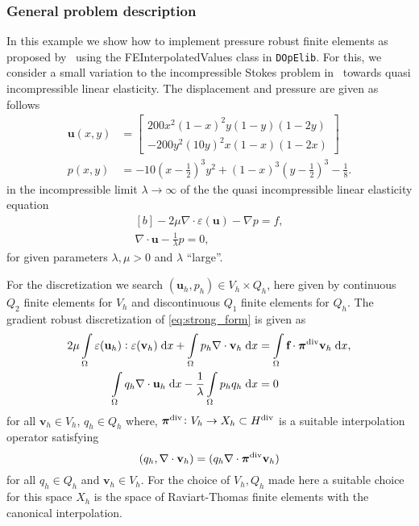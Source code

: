 \subsubsection{General problem description}
 In this example we show how to implement pressure robust finite elements
 as proposed by~\cite{Linke:2014} using the
 FEInterpolatedValues class in \texttt{DOpElib}.
 For this, we consider a small variation to the incompressible
 Stokes problem in~\cite{Linke:2014} towards quasi incompressible
 linear elasticity. The displacement and pressure are given as follows
 \begin{align*}
   \textbf{u}(x, y) & = \begin{bmatrix}
 		    200 x^2 (1-x)^2y(1-y)(1-2y) \\
 		    -200 y^2(10y)^2x(1-x)(1-2x)
 	  	   \end{bmatrix} \\
   p(x,y) & = -10\left(x - \frac{1}{2}\right)^3y^2 + (1-x)^3\left(y-\frac{1}{2}\right)^3 - \frac{1}{8}.
 \end{align*}
 in the incompressible limit $\lambda \rightarrow \infty$ of the 
 the quasi incompressible linear elasticity equation
 \begin{equation}
   \begin{aligned}[b] \label{eq:strong_form}
     -2\mu \nabla \! \cdot \! \varepsilon(\textbf{u}) - \nabla p = f, \\
     \nabla \cdot \textbf{u} - \frac{1}{\lambda} p = 0,
   \end{aligned}
 \end{equation}
 for given parameters $\lambda, \mu > 0$ and $\lambda$ ``large''.

 For the discretization we search $(\textbf{u}_h,p_h) \in V_h \times Q_h$,
 here given by continuous $Q_2$ finite elements for $V_h$ and discontinuous
 $Q_1$ finite elements for $Q_h$.
 The gradient robust discretization of \eqref{eq:strong_form} is given as
  \begin{align}
   2\mu \int\limits_\Omega \varepsilon(\textbf{u}_h) : \varepsilon(\textbf{v}_h) \; \mathrm{d} x + 
   \int\limits_\Omega p_h \nabla \cdot \textbf{v}_h \; \mathrm{d} x & = \int\limits_\Omega \textbf{f} \cdot  \bm{\pi}^{\rm{div}} \textbf{v}_h \; \mathrm{d} x  \label{eq:modified_weak_form} , \\
   \int\limits_\Omega q_h \nabla \cdot \textbf{u}_h \; \mathrm{d} x  - \dfrac{1}{\lambda}\int\limits_\Omega p_hq_h \; \mathrm{d} x  & = 0  \label{eq:nearly_incompress_modified}
 \end{align}
 for all $\textbf{v}_h \in V_h$, $q_h \in Q_h$
 where, $\bm{\pi}^{\rm{div}} \colon V_h\rightarrow X_h \subset H^{\rm{div}}$
 is a suitable interpolation operator satisfying
 \[
 (q_h, \nabla \cdot \textbf{v}_h) = (q_h \nabla \cdot \bm{\pi}^{\rm{div}}\textbf{v}_h) 
 \]
 for all $q_h \in Q_h$ and $\textbf{v}_h \in V_h$. For the choice of $V_h,Q_h$ made here a
 suitable choice for this space $X_h$ is the space of Raviart-Thomas finite elements
 with the canonical interpolation.

